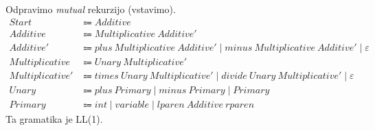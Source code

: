\documentclass{report}
\newcommand{\Null}{\varepsilon}
\newcommand{\Spc}{\ }
\newcommand{\Union}{\mathrel{|}}
\newcommand{\Arrow}{\Coloneq}
\newcommand{\NT}[1]{{#1}}
\newcommand{\T}[1]{{#1}}
\begin{document}
Odpravimo \emph{mutual} rekurzijo (vstavimo).
\begin{align*}
  \NT{Start} &\Arrow \NT{Additive}\\[1em]
  \NT{Additive} &\Arrow \NT{Multiplicative} \Spc \NT{Additive'}\\
  \NT{Additive'} &\Arrow \T{plus} \Spc \NT{Multiplicative} \Spc \NT{Additive'} \Union \T{minus} \Spc \NT{Multiplicative} \Spc \NT{Additive'} \Union \Null\\[1em]
  \NT{Multiplicative} &\Arrow \NT{Unary} \Spc \NT{Multiplicative'}\\
  \NT{Multiplicative'} &\Arrow \T{times} \Spc \NT{Unary} \Spc \NT{Multiplicative'} \Union \T{divide} \Spc \NT{Unary} \Spc \NT{Multiplicative'} \Union \Null\\[1em]
  \NT{Unary} &\Arrow \T{plus} \Spc \NT{Primary} \Union \T{minus} \Spc \NT{Primary} \Union \NT{Primary}\\[1em]
  \NT{Primary} &\Arrow \T{int} \Union \T{variable} \Union \T{lparen} \Spc \NT{Additive} \Spc \T{rparen}
\end{align*}
Ta gramatika je LL(1).
\end{document}
